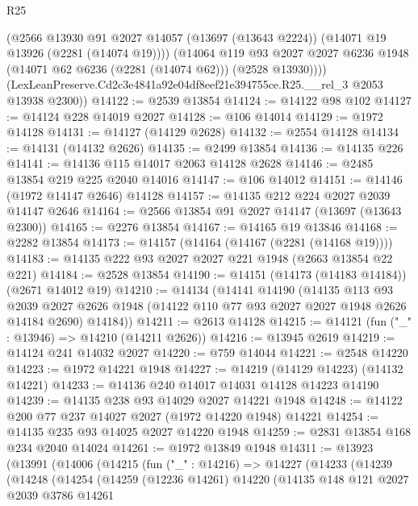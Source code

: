 \begin{lexlean}{R25}
\begin{coremodule}
          (@2566
            @13930
            @91
            @2027
            @14057
            (@13697 (@13643 @2224))
            (@14071 @19 @13926 (@2281 (@14074 @19))))
          (@14064
            @119
            @93
            @2027
            @2027
            @6236
            @1948
            (@14071 @62 @6236 (@2281 (@14074 @62)))
            (@2528 @13930))))
      (LexLeanPreserve.Cd2c3e4841a92e04df8eef21e394755ce.R25.__rel_3 @2053 @13938 @2300))
@14122 := @2539 @13854
@14124 := @14122 @98 @102
@14127 := @14124 @228 @14019 @2027
@14128 := @106 @14014
@14129 := @1972 @14128
@14131 := @14127 (@14129 @2628)
@14132 := @2554 @14128
@14134 := @14131 (@14132 @2626)
@14135 := @2499 @13854
@14136 := @14135 @226
@14141 := @14136 @115 @14017 @2063 @14128 @2628
@14146 := @2485 @13854 @219 @225 @2040 @14016
@14147 := @106 @14012
@14151 := @14146 (@1972 @14147 @2646) @14128
@14157 := @14135 @212 @224 @2027 @2039 @14147 @2646
@14164 := @2566 @13854 @91 @2027 @14147 (@13697 (@13643 @2300))
@14165 := @2276 @13854
@14167 := @14165 @19 @13846
@14168 := @2282 @13854
@14173 := @14157 (@14164 (@14167 (@2281 (@14168 @19))))
@14183 := @14135 @222 @93 @2027 @2027 @221 @1948 (@2663 @13854 @22 @221)
@14184 := @2528 @13854
@14190 := @14151 (@14173 (@14183 @14184)) (@2671 @14012 @19)
@14210 := @14134
    (@14141
      @14190
      (@14135
        @113
        @93
        @2039
        @2027
        @2626
        @1948
        (@14122 @110 @77 @93 @2027 @2027 @1948 @2626 @14184 @2690)
        @14184))
@14211 := @2613 @14128
@14215 := @14121 (fun ("_" : @13946) => @14210 (@14211 @2626))
@14216 := @13945 @2619
@14219 := @14124 @241 @14032 @2027
@14220 := @759 @14044
@14221 := @2548 @14220
@14223 := @1972 @14221 @1948
@14227 := @14219 (@14129 @14223) (@14132 @14221)
@14233 := @14136 @240 @14017 @14031 @14128 @14223 @14190
@14239 := @14135 @238 @93 @14029 @2027 @14221 @1948
@14248 := @14122 @200 @77 @237 @14027 @2027 (@1972 @14220 @1948) @14221
@14254 := @14135 @235 @93 @14025 @2027 @14220 @1948
@14259 := @2831 @13854 @168 @234 @2040 @14024
@14261 := @1972 @13849 @1948
@14311 := @13923
    (@13991
      (@14006
        (@14215
          (fun ("_" : @14216) =>
          @14227
            (@14233
              (@14239
                (@14248
                  (@14254
                    (@14259
                      (@12236 @14261)
                      @14220
                      (@14135
                        @148
                        @121
                        @2027
                        @2039
                        @3786
                        @14261

\end{coremodule}
\end{lexlean}
